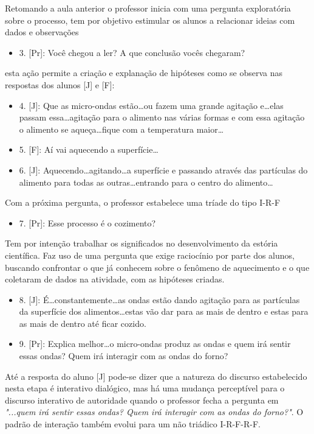 Retomando a aula anterior o professor inicia com uma pergunta exploratória sobre o processo, tem por objetivo estimular os alunos a relacionar ideias com dados e observações
\begin{itemize}
    \item 3. [Pr]: Você chegou a ler? A que conclusão vocês chegaram?
\end{itemize}
esta ação permite a criação e explanação de hipóteses como se observa nas respostas dos alunos [J] e [F]:
\begin{itemize}
    \item 4. [J]: Que as micro-ondas estão\ldots ou fazem uma grande agitação e\ldots elas passam essa\ldots agitação para o alimento nas várias formas e com essa agitação o alimento se aqueça\ldots fique com a
    temperatura maior\ldots
    \item 5. [F]: Aí vai aquecendo a superfície\ldots
    \item 6. [J]: Aquecendo\ldots agitando\ldots a superfície e passando através das partículas do alimento
    para todas as outras\ldots entrando para o centro do alimento\ldots
\end{itemize}
Com a próxima pergunta, o professor estabelece uma tríade do tipo I-R-F
\begin{itemize}
    \item 7. [Pr]: Esse processo é o cozimento?
\end{itemize}
Tem por intenção trabalhar os significados no desenvolvimento da estória científica. Faz uso de uma pergunta que exige raciocínio por parte dos alunos, buscando confrontar o que já conhecem sobre o fenômeno de aquecimento e o que coletaram de dados na atividade, com as hipóteses criadas.
\begin{itemize}
    \item 8. [J]: É\ldots constantemente\ldots as ondas estão dando agitação para as partículas da superfície dos alimentos\ldots estas vão dar para as mais de dentro e estas para as mais de dentro até ficar cozido.
    \item 9. [Pr]: Explica melhor\ldots o micro-ondas produz as ondas e quem irá sentir essas ondas? Quem irá interagir com as ondas do forno?
\end{itemize}
Até a resposta do aluno [J] pode-se dizer que a natureza do discurso estabelecido nesta etapa é interativo dialógico, mas há uma mudança perceptível para o discurso interativo de autoridade quando o professor fecha a pergunta em \emph{"...quem irá sentir essas ondas? Quem irá interagir com as ondas do forno?"}. O padrão de interação também evolui para um não triádico I-R-F-R-F.
